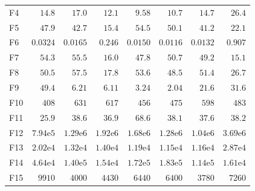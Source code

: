 \begin{tabular}{lrrrrrrr}
F4 & $14.8$ & $17.0$ & $12.1$ & $9.58$ & $10.7$ & $14.7$ & $26.4$ \\
F5 & $47.9$ & $42.7$ & $15.4$ & $54.5$ & $50.1$ & $41.2$ & $22.1$ \\
F6 & $0.0324$ & $0.0165$ & $0.246$ & $0.0150$ & $0.0116$ & $0.0132$ & $0.907$ \\
F7 & $54.3$ & $55.5$ & $16.0$ & $47.8$ & $50.7$ & $49.2$ & $\mathbf{15.1}$ \\
F8 & $50.5$ & $57.5$ & $\mathbf{17.8}$ & $53.6$ & $48.5$ & $51.4$ & $26.7$ \\
F9 & $49.4$ & $6.21$ & $6.11$ & $3.24$ & $2.04$ & $21.6$ & $31.6$ \\
F10 & $408$ & $631$ & $617$ & $456$ & $475$ & $598$ & $483$ \\
F11 & $\mathbf{25.9}$ & $38.6$ & $36.9$ & $68.6$ & $38.1$ & $37.6$ & $38.2$ \\
F12 & $7.94\mathrm{e}{5}$ & $1.29\mathrm{e}{6}$ & $1.92\mathrm{e}{6}$ & $1.68\mathrm{e}{6}$ & $1.28\mathrm{e}{6}$ & $1.04\mathrm{e}{6}$ & $3.69\mathrm{e}{6}$ \\
F13 & $2.02\mathrm{e}{4}$ & $1.32\mathrm{e}{4}$ & $1.40\mathrm{e}{4}$ & $1.19\mathrm{e}{4}$ & $1.15\mathrm{e}{4}$ & $1.16\mathrm{e}{4}$ & $2.87\mathrm{e}{4}$ \\
F14 & $4.64\mathrm{e}{4}$ & $1.40\mathrm{e}{5}$ & $1.54\mathrm{e}{4}$ & $1.72\mathrm{e}{5}$ & $1.83\mathrm{e}{5}$ & $1.14\mathrm{e}{5}$ & $1.61\mathrm{e}{4}$ \\
F15 & $9910$ & $4000$ & $4430$ & $6440$ & $6400$ & $3780$ & $7260$ \\
\bottomrule
\end{tabular}
